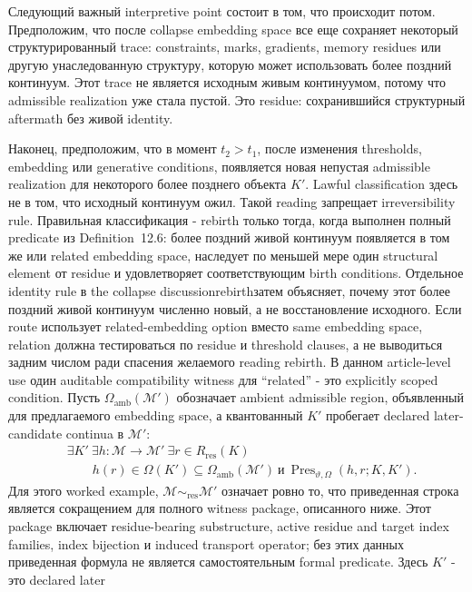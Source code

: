 Следующий важный interpretive point состоит в том, что происходит потом.
Предположим, что после collapse embedding space все еще сохраняет некоторый
структурированный trace: constraints, marks, gradients, memory residues или
другую унаследованную структуру, которую может использовать более поздний
континуум. Этот trace не является исходным живым континуумом, потому что
admissible realization уже стала пустой. Это residue: сохранившийся
структурный aftermath без живой identity.

Наконец, предположим, что в момент \(t_2>t_1\), после изменения thresholds,
embedding или generative conditions, появляется новая непустая admissible
realization для некоторого более позднего объекта \(K'\). Lawful
classification здесь не в том, что исходный континуум ожил. Такой reading
запрещает irreversibility rule. Правильная классификация - rebirth только
тогда, когда выполнен полный predicate из Definition~12.6: более поздний
живой континуум появляется в том же или related embedding space, наследует
по меньшей мере один structural element от residue и удовлетворяет
соответствующим birth conditions. Отдельное identity rule в
the collapse discussionrebirthзатем объясняет, почему этот более поздний
живой континуум численно новый, а не восстановление исходного.
Если route использует related-embedding option вместо same embedding space,
relation должна тестироваться по residue и threshold clauses, а не
выводиться задним числом ради спасения желаемого reading rebirth. В данном
article-level use один auditable compatibility witness для ``related'' -
это explicitly scoped condition. Пусть \(\Omega_{\mathrm{amb}}(\mathcal{M}')\)
обозначает ambient admissible region, объявленный для предлагаемого
embedding space, а квантованный \(K'\) пробегает declared later-candidate
continua в \(\mathcal{M}'\):
\[
  \begin{aligned}
  &\exists K'\ \exists h:\mathcal{M}\to\mathcal{M}'\ \exists r\in R_{\mathrm{res}}(K)\\
  &\qquad h(r)\in\Omega(K')\subseteq\Omega_{\mathrm{amb}}(\mathcal{M}')\ \text{и}\
  \operatorname{Pres}_{\vartheta,\Omega}(h,r;K,K').
  \end{aligned}
\]
Для этого worked example, \(\mathcal{M}\sim_{\mathrm{res}}\mathcal{M}'\)
означает ровно то, что приведенная строка является сокращением для полного
witness package, описанного ниже. Этот package включает residue-bearing
substructure, active residue and target index families, index bijection и
induced transport operator; без этих данных приведенная формула не является
самостоятельным formal predicate. Здесь \(K'\) - это declared later
